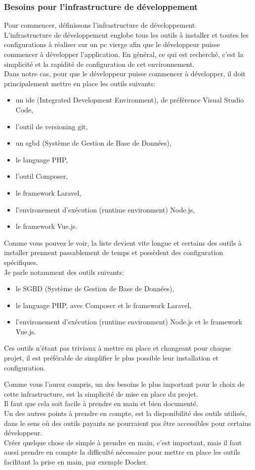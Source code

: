 \documentclass[
    iai, %
    il, %
]{heig-tb}
\begin{document}
\subsubsection{Besoins pour l'infrastructure de développement}
Pour commencer, définissons l'infrastructure de développement.\\
L'infrastructure de développement englobe tous les outils à installer et toutes les configurations à réaliser sur un pc vierge afin que le développeur puisse commencer à développer l'application.
En général, ce qui est recherché, c'est la simplicité et la rapidité de configuration de cet environnement.\\
Dans notre cas, pour que le développeur puisse commencer à développer, il doit principalement mettre en place les outils suivants:
\begin{itemize}
    \item un \Gls{ide} (Integrated Development Environment), de préférence Visual Studio Code,
    \item l'outil de versioning \Gls{git},
    \item un \Gls{sgbd} (Système de Gestion de Base de Données),
    \item le language PHP,
    \item l'outil Composer,
    \item le framework Laravel,
    \item l'environement d'exécution (runtime environment) Node.js,
    \item le framework Vue.js.
\end{itemize}
Comme vous pouvez le voir, la liste devient vite longue et certains des outils à installer prennent passablement de temps et possèdent des configuration spécifiques.\\
Je parle notamment des outils suivants:
\begin{itemize}
    \item le SGBD (Système de Gestion de Base de Données),
    \item le language PHP, avec Composer et le framework Laravel,
    \item l'environement d'exécution (runtime environment) Node.js et le framework Vue.js.
\end{itemize}
Ces outils n'étant pas triviaux à mettre en place et changeant pour chaque projet, il est préférable de simplifier le plus possible leur installation et configuration.

Comme vous l'aurez compris, un des besoins le plus important pour le choix de cette infrastructure, est la simplicité de mise en place du projet.\\
Il faut que cela soit facile à prendre en main et bien documenté.\\
Un des autres points à prendre en compte, est la disponibilité des outils utilisés, dans le sens où des outils payants ne pourraient pas être accessibles pour certains développeur.\\
Créer quelque chose de simple à prendre en main, c'est important, mais il faut aussi prendre en compte la difficulté nécessaire pour mettre en place les outils facilitant la prise en main, par exemple Docker.
\end{document}
